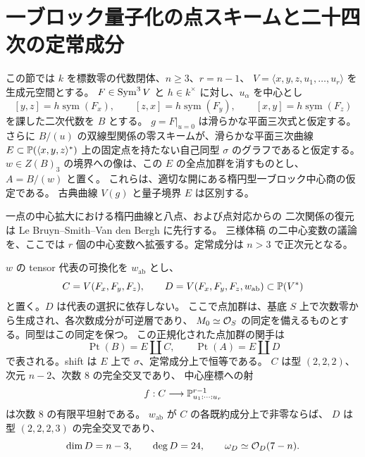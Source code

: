 \section{一ブロック量子化の点スキームと二十四次の定常成分}
\label{sec:points}

この節では $k$ を標数零の代数閉体、$n\geq3$、$r=n-1$、
$V=\langle x,y,z,u_1,\ldots,u_r\rangle$ を生成元空間とする。
$F\in\operatorname{Sym}^3V$ と $h\in k^\times$ に対し、$u_\alpha$ を中心とし
\begin{equation}\label{eq:point-relations}
 [y,z]=h\operatorname{sym}(F_x),\qquad
 [z,x]=h\operatorname{sym}(F_y),\qquad
 [x,y]=h\operatorname{sym}(F_z)
\end{equation}
を課した二次代数を $B$ とする。
$g=F|_{u=0}$ は滑らかな平面三次式と仮定する。
さらに $B/(u)$ の双線型関係の零スキームが、滑らかな平面三次曲線
$E\subset\mathbb P(\langle x,y,z\rangle^*)$ 上の固定点を持たない自己同型
$\sigma$ のグラフであると仮定する。
$w\in Z(B)_3$ の境界への像は、この $E$ の全点加群を消すものとし、
$A=B/(w)$ と置く。
これらは、適切な開にある楕円型一ブロック中心商の仮定である。
古典曲線 $V(g)$ と量子境界 $E$ は区別する。

一点の中心拡大における楕円曲線と八点、および点対応からの
二次関係の復元は Le Bruyn--Smith--Van den Bergh
\cite[Theorem~4.2.2, Proposition~4.2.5 and \S4.3]{LBSV} に先行する。
三様体稿 \cite[\S23]{Threefold} の二中心変数の議論を、ここでは
$r$ 個の中心変数へ拡張する。定常成分は $n>3$ で正次元となる。

\begin{theorem}[点関手の分解]\label{thm:point-nfold}
$w$ の tensor 代表の可換化を $w_{\mathrm{ab}}$ とし、
\begin{equation}\label{eq:point-CD}
 C=V(F_x,F_y,F_z),\qquad
 D=V(F_x,F_y,F_z,w_{\mathrm{ab}})\subset\mathbb P(V^*)
\end{equation}
と置く。$D$ は代表の選択に依存しない。
ここで点加群は、基底 $S$ 上で次数零から生成され、各次数成分が可逆層であり、
$M_0\simeq\mathcal O_S$ の同定を備えるものとする。同型はこの同定を保つ。
この正規化された点加群の関手は
\begin{equation}\label{eq:point-disjoint}
 \operatorname{Pt}(B)=E\amalg C,\qquad
 \operatorname{Pt}(A)=E\amalg D
\end{equation}
で表される。shift は $E$ 上で $\sigma$、定常成分上で恒等である。
$C$ は型 $(2,2,2)$、次元 $n-2$、次数 $8$ の完全交叉であり、
中心座標への射
\begin{equation}\label{eq:point-critical-cover}
 f:C\longrightarrow\mathbb P^{r-1}_{u_1:\cdots:u_r}
\end{equation}
は次数 $8$ の有限平坦射である。
$w_{\mathrm{ab}}$ が $C$ の各既約成分上で非零ならば、
$D$ は型 $(2,2,2,3)$ の完全交叉であり、
\begin{equation}\label{eq:point-invariants}
 \dim D=n-3,\qquad \deg D=24,\qquad
 \omega_D\simeq\mathcal O_D(7-n).
\end{equation}
\end{theorem}

